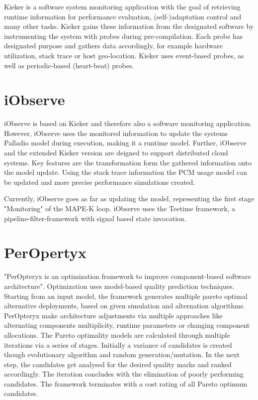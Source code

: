 Kieker is a software system monitoring application with the goal of retrieving runtime information for performance evaluation, (self-)adaptation control and many other tasks. Kieker gains these information from the designated software by instrumenting the system with probes during pre-compilation. Each probe has designated purpose and gathers data accordingly, for example hardware utilization, stack trace or host geo-location. Kieker uses event-based probes, as well as periodic-based (heart-beat) probes.


\section{iObserve}
\label{sec:Foundations:iobserve}

iObserve is based on Kieker and therefore also a software monitoring application. However, iObserve uses the monitored information to update the systems Palladio model during execution, making it a runtime model. Further, iObserve and the extended Kieker version are deigned to support distributed cloud systems. Key features are the transformation form the gathered information onto the model update. Using the stack trace information the PCM usage model can be updated and more precise performance simulations created. 

Currently, iObserve goes as far as updating the model, representing the first stage "Monitoring" of the MAPE-K loop. iObserve uses the Teetime framework, a pipeline-filter-framework with signal based state invocation.\cite{Heinrich.2016}

\section{PerOpertyx}
\label{sec:Foundations:peropteryx}

"PerOpteryx is an optimization framework to improve component-based software architecture". Optimization uses model-based quality prediction techniques. Starting from an input model, the framework generates multiple pareto optimal alternative deployments, based on given simulation and alternation algorithms. PerOpteryx make architecture adjustments via multiple approaches like alternating components multiplicity, runtime parameters or changing component allocations. The Pareto optimality models are calculated through multiple iterations via a series of stages. Initially a variance of candidates is created though evolutionary algorithm and random generation/mutation. In the next step, the candidates get analysed for the desired quality marks and ranked accordingly. The iteration concludes with the elimination of poorly performing candidates. The framework terminates with a cost rating of all Pareto optimum candidates.


